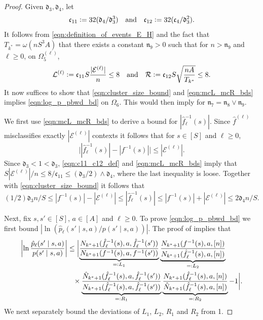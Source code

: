 \documentclass[11pt]{article}
\newcommand{\defeq}{=\vcentcolon}
\newcommand{\eqdef}{\vcentcolon=}
\newcommand{\mf}[1]{\mathfrak{#1}}
\newcommand{\mcE}{\mathcal{E}}
\newcommand{\mcL}{\mathcal{L}}
\newcommand{\mcR}{\mathcal{R}}
\theoremstyle{definition}
\theoremstyle{definition}
\begin{document}
\begin{proof}
	Given $\mf{d}_3,\mf{d}_4$, let
	\begin{equation}
		\label{eqn:c11_c12_def}
		\mf{c}_{11} \eqdef 32(\mf{d}_4/\mf{d}_3^3)
		\quad\mathrm{and}\quad
		\mf{c}_{12} \eqdef 32(\mf{c}_4/\mf{d}_3^2).
	\end{equation}
	It follows from \eqref{eqn:definition_of_events_E_H} and the fact that $T_{k^*}=\omega(nS^3A)$ that there exists a constant $\mf{n}_9>0$ such that for $n> \mf{n}_9$ and $\ell\geq 0$, on $\Omega_5^{(\ell)}$,
	\begin{equation}
		\label{eqn:mcL_mcR_bds}
		\mcL^{(\ell)}
		\eqdef
		\mf{c}_{11}S\frac{|\mcE^{(\ell)}|}{n}
		\leq
		8
		\quad \mathrm{and}\quad
		\mcR
		\eqdef
		\mf{c}_{12}S\sqrt{\frac{nA}{T_{k^*}}}
		\leq
		8
		.
	\end{equation}
	It now suffices to show that \eqref{eqn:cluster_size_bound} and \eqref{eqn:mcL_mcR_bds} implies \eqref{eqn:log_p_pbwd_bd} on $\Omega_6$.
	This would then imply  for $\mf{n}_7=\mf{n}_8\vee \mf{n}_9$.

	We first use \eqref{eqn:mcL_mcR_bds} to derive a bound for $|\hat{f}_{\ell}^{-1}(s)|$.
	Since $\hat{f}^{({\ell})}$ misclassifies exactly $|\mcE^{(\ell)}|$ contexts it follows that for $s\in[S]$ and $\ell\geq 0$,
	\begin{equation}
		\bigl||\hat{f}_{\ell}^{-1}(s)|-|f^{-1}(s)|\bigr|\leq |\mcE^{(\ell)}|
		.
	\end{equation}
	Since $\mf{d}_3<1<\mf{d}_3$, \eqref{eqn:c11_c12_def} and \eqref{eqn:mcL_mcR_bds} imply that $S|\mcE^{(\ell)}|/n\leq 8/\mf{c}_{11}\leq (\mf{d}_3/2) \wedge \mf{d}_4$, where the last inequality is loose.
	Together with \eqref{eqn:cluster_size_bound} it follows that
	\begin{equation}
		\label{eqn:bound_est_cluster_size}
		(1/2)\mf{d}_3n/S \leq |f^{-1}(s)|-|\mcE^{(\ell)}|\leq |\hat{f}_{\ell}^{-1}(s)|\leq |f^{-1}(s)|+|\mcE^{(\ell)}| \leq 2\mf{d}_4 n/S.
	\end{equation}

	Next, fix $s,s'\in[S]$, $a\in[A]$ and $\ell \geq 0$.
	To prove \eqref{eqn:log_p_pbwd_bd} we first bound $|\ln(\hat{p}_{\ell}(s'\mid s,a)/\allowbreak p(s'\mid s,a))|$.
	The proof of \cite[Lemma 25]{Jedra:2022} implies that
	\begin{align}
		\biggl|\ln \frac{\hat{p}_{\ell}(s'\mid s,a)}{p(s'\mid s,a)}\biggr|
			&
		\leq
		\biggl|
		\underbrace{
		\frac{N_{k^*+1}(\hat{f}_{\ell}^{-1}(s),a,\hat{f}_{\ell}^{-1}(s'))}{N_{k^*+1}(f^{-1}(s),a,f^{-1}(s'))}
		}_{\defeq L_1}
		\underbrace{
			\frac{N_{k^*+1}(f^{-1}(s),a,[n])}{N_{k^*+1}(\hat{f}_{\ell}^{-1}(s),a,[n])}
		}_{\defeq L_2}
		\nonumber
		\\
			&
		\phantom{\leq}
		\times
		\underbrace{
		\frac{\hat{N}_{k^*+1}(\hat{f}_{\ell}^{-1}(s),a,\hat{f}_{\ell}^{-1}(s'))}{N_{k^*+1}(\hat{f}_{\ell}^{-1}(s),a,\hat{f}_{\ell}^{-1}(s'))}
		}_{\defeq R_1}
		\underbrace{
		\frac{N_{k^*+1}(\hat{f}_{\ell}^{-1}(s),a,[n])}{\hat{N}_{k^*+1}(\hat{f}_{\ell}^{-1}(s),a,[n])}
		}_{\defeq R_2}
		-
		1
		\biggr|
		.
		\label{eqn:log_ratio_bound}
	\end{align}
	We next separately bound the deviations of $L_1$, $L_2$, $R_1$ and $R_2$ from 1.


\end{proof}
\end{document}
